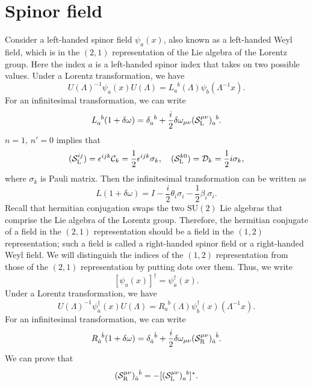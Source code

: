 \section{Spinor field}
Consider a left-handed spinor field $\psi_a(x)$, also known as a left-handed Weyl field, which is in the $(2,1)$ representation of the Lie algebra of the Lorentz group. Here the index $a$ is a left-handed spinor index that takes on two possible values. Under a Lorentz transformation, we have
\[U(\Lambda)^{-1} \psi_a(x) U(\Lambda) = L_a^{\phantom{a}b}(\Lambda) \psi_b(\Lambda^{-1}x).\]
For an infinitesimal transformation, we can write
\[L_a^{\phantom{a}b}(1+\delta \omega) = \delta_a^{\phantom{a}b} + \frac{i}{2} \delta \omega_{\mu \nu} (\mathcal{S}_{\rm L}^{\mu \nu})_a^{\phantom{a}b}.\]
$n=1,\, n'=0$  implies that
\[(\mathcal{S}_{\rm L}^{i j}) =  \epsilon^{ijk}\mathcal{C}_k = \frac{1}{2}\epsilon^{ijk}\sigma_k, \quad  (\mathcal{S}_{\rm L}^{k 0}) = \mathcal{D}_{k} = \frac{1}{2}i\sigma_k,\]
where $\sigma_k$ is Pauli matrix.
Then the infinitesimal transformation can be written as
\[L(1+\delta \omega) = I - \frac{i}{2} \theta_i \sigma_i -\frac{1}{2} \beta_i \sigma_i.\]
Recall that hermitian conjugation swaps the two $\mathrm{SU}(2)$ Lie algebras that comprise the Lie algebra of the Lorentz group.
Therefore, the hermitian conjugate of a field in the $(2,1)$ representation should be a field in the $(1,2)$ representation; such a field is called a right-handed spinor field or a right-handed Weyl field. We will distinguish the indices of the $(1,2)$ representation from those of the $(2,1)$ representation by putting dots over them. Thus, we write
\[[\psi_a(x)]^{\dagger} = \psi^{\dagger}_{\dot{a}}(x).\]
Under a Lorentz transformation, we have
\[U(\Lambda)^{-1} \psi^{\dagger}_{\dot{a}}(x) U(\Lambda) = R_{\dot{a}}^{\phantom{a}\dot{b}}(\Lambda) \psi^{\dagger}_{\dot{b}}(x)(\Lambda^{-1}x).\]
For an infinitesimal transformation, we can write
\[R_{\dot{a}}^{\phantom{a}\dot{b}}(1+\delta \omega) = \delta_{\dot{a}}^{\phantom{a}\dot{b}} + \frac{i}{2} \delta \omega_{\mu \nu} (\mathcal{S}_{\rm R}^{\mu \nu})_{\dot{a}}^{\phantom{a}\dot{b}}.\]
We can prove that
\[(\mathcal{S}_{\rm R}^{\mu \nu})_{\dot{a}}^{\phantom{a}\dot{b}} = -[(\mathcal{S}_{\rm L}^{\mu \nu})_a^{\phantom{a}b}]^*.\]

